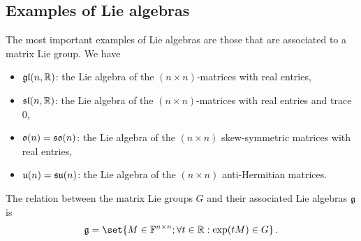     \subsection{Examples of Lie algebras}
        The most important examples of Lie algebras are those that are associated to a matrix Lie group. We have
        \begin{itemize}
            \item $\operatorname{\mathfrak{gl}}(n, \mathbb{R})$: the Lie algebra of the $(n \times n)$-matrices with real entries,
            \item $\operatorname{\mathfrak{sl}}(n, \mathbb{R})$: the Lie algebra of the $(n \times n)$-matrices with real entries and trace 0,
            \item $\operatorname{\mathfrak{o}}(n) = \operatorname{\mathfrak{so}}(n)$: the Lie algebra of the $(n \times n)$ skew-symmetric matrices with real entries,
            \item $\operatorname{\mathfrak{u}}(n) = \operatorname{\mathfrak{su}}(n)$: the Lie algebra of the $(n \times n)$ anti-Hermitian matrices.
        \end{itemize}

        The relation between the matrix Lie groups $G$ and their associated Lie algebras $\operatorname{\mathfrak{g}}$ is
        \begin{equation}
            \glie = \set{M \in \F^{n \times n}; \forall t \in \R: \exp(t M) \in G} \thinspace .
        \end{equation}

